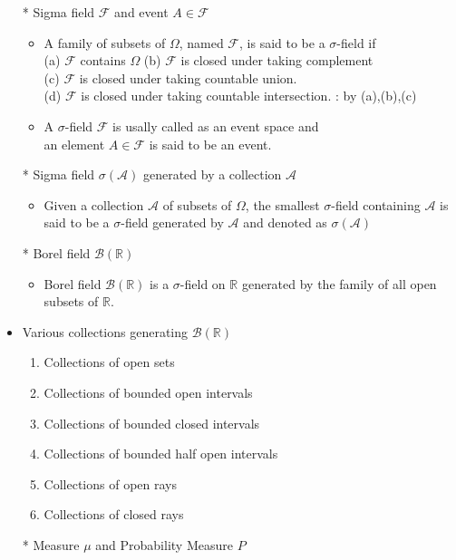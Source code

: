 \documentclass[12pt, A4]{article}
\begin{document}
\begin{itemize}
	\item[*] Sigma field $\mathcal{F}$ and event $A\in \mathcal{F}$
	\begin{itemize}
		\item A family of subsets of $\Omega$, named $\mathcal{F}$, is said to be a $\sigma$-field if \\(a) $\mathcal{F}$ contains $\Omega$ \quad (b) $\mathcal{F}$ is closed under taking complement \\(c) $\mathcal{F}$ is closed under taking countable union. \\(d) $\mathcal{F}$ is closed under taking countable intersection. : by (a),(b),(c)
		\item A $\sigma$-field $\mathcal{F}$ is usally called as an event space and\\ an element $A\in \mathcal{F}$ is said to be an event.
	\end{itemize}
	\item[*] Sigma field $\sigma(\mathcal{A})$ generated by a collection $\mathcal{A}$
	\begin{itemize}
		\item Given a collection $\mathcal{A}$ of subsets of $\Omega$, the smallest $\sigma$-field containing $\mathcal{A}$ is said to be a $\sigma$-field generated by $\mathcal{A}$ and denoted as $\sigma(\mathcal{A})$
	\end{itemize}
	\item[*] Borel field $\mathcal{B}(\mathbb{R})$
	\begin{itemize}
		\item Borel field $\mathcal{B}(\mathbb{R})$ is a $\sigma$-field on $\mathbb{R}$ generated by the family of all open subsets of $\mathbb{R}$.
	\end{itemize}
	\item Various collections generating $\mathcal{B}(\mathbb{R})$
	\begin{enumerate}
		\item Collections of open sets
		\item Collections of bounded open intervals
		\item Collections of bounded closed intervals
		\item Collections of bounded half open intervals
		\item Collections of open rays
		\item Collections of closed rays
	\end{enumerate}
    \item[*] Measure $\mu$ and Probability Measure $P$

\end{itemize}
\end{document}
